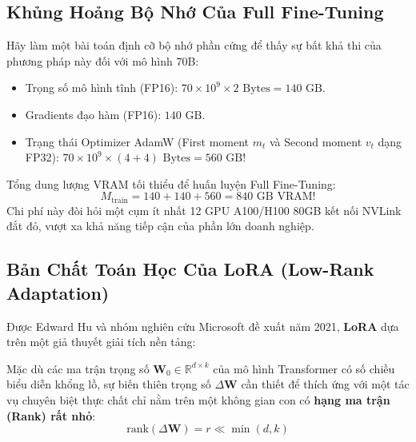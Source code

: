 \subsection{Khủng Hoảng Bộ Nhớ Của Full Fine-Tuning}
Hãy làm một bài toán định cỡ bộ nhớ phần cứng để thấy sự bất khả thi của phương pháp này đối với mô hình 70B:
\begin{itemize}
  \item Trọng số mô hình tĩnh (FP16): $70 \times 10^9 \times 2\text{ Bytes} = 140\text{ GB}$.
  \item Gradients đạo hàm (FP16): $140\text{ GB}$.
  \item Trạng thái Optimizer AdamW (First moment $m_t$ và Second moment $v_t$ dạng FP32): $70 \times 10^9 \times (4 + 4)\text{ Bytes} = 560\text{ GB}$!
\end{itemize}
Tổng dung lượng VRAM tối thiểu để huấn luyện Full Fine-Tuning:
\begin{equation}
M_{\text{train}} = 140 + 140 + 560 = 840\text{ GB VRAM!}
\end{equation}
Chi phí này đòi hỏi một cụm ít nhất 12 GPU A100/H100 80GB kết nối NVLink đắt đỏ, vượt xa khả năng tiếp cận của phần lớn doanh nghiệp.

\subsection{Bản Chất Toán Học Của LoRA (Low-Rank Adaptation)}
Được Edward Hu và nhóm nghiên cứu Microsoft đề xuất năm 2021, \textbf{LoRA} dựa trên một giả thuyết giải tích nền tảng:

\begin{theorem}
Mặc dù các ma trận trọng số $\mathbf{W}_0 \in \mathbb{R}^{d \times k}$ của mô hình Transformer có số chiều biểu diễn khổng lồ, sự biến thiên trọng số $\Delta \mathbf{W}$ cần thiết để thích ứng với một tác vụ chuyên biệt thực chất chỉ nằm trên một không gian con có \textbf{hạng ma trận (Rank) rất nhỏ}:
\begin{equation}
\text{rank}(\Delta \mathbf{W}) = r \ll \min(d, k)
\end{equation}
\end{theorem}

